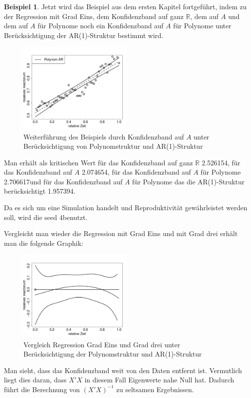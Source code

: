 \documentclass[12pt,a4paper]{article}
\theoremstyle{definition}
\newtheorem{Beispiel}[Definition]{Beispiel}
\theoremstyle{definition}
\theoremstyle{definition}
\theoremstyle{definition}
\newcommand{\cR}{2.526154}
\newcommand{\seedsimulation}{4}
\newcommand{\cA}{2.074654}
\newcommand{\cAP}{2.706617}
\newcommand{\cAPAR}{1.957394}
\begin{document}
\begin{Beispiel}
Jetzt wird das Beispiel aus dem ersten Kapitel fortgeführt, indem zu der Regression mit Grad Eins, dem Konfidenzband auf ganz $\mathbb{R}$, dem auf $A$ und dem auf $A$ für Polynome noch ein Konfidenzband auf $A$ für Polynome unter Berücksichtigung der AR(1)-Struktur bestimmt wird.

\begin{figure}[H] 
  \centering
     \includegraphics[width=0.5\textwidth]{Bsp-KB-poly-AR}
  \caption{Weiterführung des Beispiels durch Konfidenzband auf $A$ unter Berücksichtigung von Polynomstruktur und AR(1)-Struktur}
  \label{Bsp-KB-poly-AR}
\end{figure}

Man erhält als kritischen Wert für das Konfidenzband auf ganz $\mathbb{R}$ \cR , für das Konfidenzband auf $A$ \cA, für das Konfidenzband auf $A$ für Polynome \cAP und für das Konfidenzband auf $A$ für Polynome das die AR(1)-Struktur berücksichtigt \cAPAR . 

Da es sich um eine Simulation handelt und Reproduktivität gewährleistet werden soll, wird die seed \seedsimulation benutzt. 

Vergleicht man wieder die Regression mit Grad Eins und mit Grad drei erhält man die folgende Graphik:

\begin{figure}[H] 
  \centering
     \includegraphics[width=0.5\textwidth]{Bsp-KB-poly-hetero-AR}
  \caption{Vergleich Regression Grad Eins und Grad drei unter Berücksichtigung der Polynomstruktur und AR(1)-Struktur}
  \label{Bsp-KB-poly-hetero-AR}
\end{figure}

Man sieht, dass das Konfidenzband weit von den Daten entfernt ist. Vermutlich liegt dies daran, dass $X'X$ in diesem Fall Eigenwerte nahe Null hat. Dadurch führt die Berechnung von $(X'X)^{-1}$ zu seltsamen Ergebnissen.

\end{Beispiel}
\end{document}
